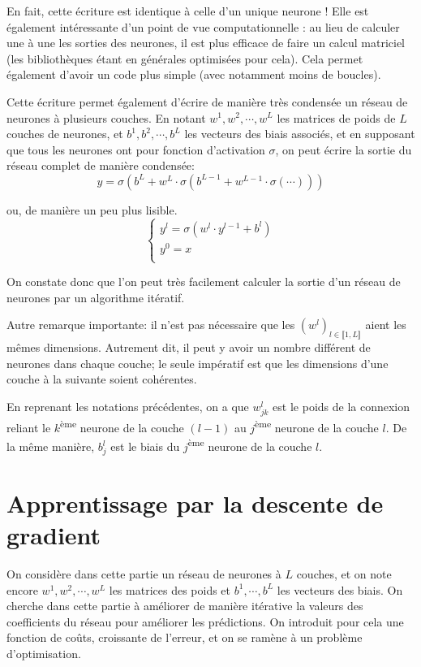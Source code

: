 En fait, cette écriture est identique à celle d'un unique neurone !
Elle est également intéressante d'un point de vue computationnelle : au lieu 
de calculer une à une les sorties des neurones, il est plus efficace de faire 
un calcul matriciel (les bibliothèques étant en générales optimisées pour cela).
Cela permet également d'avoir un code plus simple (avec notamment moins de boucles).

Cette écriture permet également d'écrire de manière très condensée un réseau 
de neurones à plusieurs couches. 
En notant $w^{1}, w^{2}, \cdots, w^{L}$ les matrices de poids de $L$ couches de 
neurones, et $b^{1}, b^{2}, \cdots, b^{L}$ les vecteurs des biais associés, et 
en supposant que tous les neurones ont pour fonction d'activation $\sigma$, on 
peut écrire la sortie du réseau complet de manière condensée:
\[
y = \sigma(b^{L} + w^{L} \cdot \sigma(b^{L-1} + w^{L-1} \cdot \sigma(\cdots)))
\]

ou, de manière un peu plus lisible.
\[
\begin{cases}
 y^{l} = \sigma(w^{l} \cdot y^{l-1} + b^{l}) \\
 y^{0} = x \\
\end{cases}
\]

On constate donc que l'on peut très facilement calculer la sortie d'un réseau 
de neurones par un algorithme itératif. 

Autre remarque importante: il n'est pas nécessaire que les $(w^{l})_{l \in \llbracket 1, L \rrbracket}$ 
aient les mêmes dimensions. Autrement dit, il peut y avoir un nombre différent 
de neurones dans chaque couche; le seule impératif est que les dimensions 
d'une couche à la suivante soient cohérentes.

En reprenant les notations précédentes, on a que $w_{jk}^{l}$ est le poids de la 
connexion reliant le $k$\textsuperscript{ème} neurone de la couche $(l-1)$ au 
$j$\textsuperscript{ème} neurone de la couche $l$.
De la même manière, $b_{j}^{l}$ est le biais du $j$\textsuperscript{ème} neurone 
de la couche $l$.



\section{Apprentissage par la descente de gradient}


On considère dans cette partie un réseau de neurones à $L$ couches, et on note 
encore $w^{1}, w^{2}, \cdots, w^{L}$ les matrices des poids et $b^{1}, \cdots, b^{L}$
les vecteurs des biais. 
On cherche dans cette partie à améliorer de manière itérative la valeurs des 
coefficients du réseau pour améliorer les prédictions. 
On introduit pour cela une fonction de coûts, croissante de l'erreur, et 
on se ramène à un problème d'optimisation.

